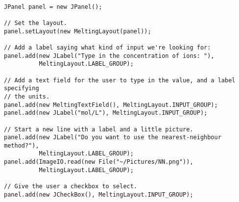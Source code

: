 \documentclass{article}
\begin{document}
\begin{verbatim}

JPanel panel = new JPanel();

// Set the layout.
panel.setLayout(new MeltingLayout(panel));

// Add a label saying what kind of input we're looking for:
panel.add(new JLabel("Type in the concentration of ions: "),
          MeltingLayout.LABEL_GROUP);

// Add a text field for the user to type in the value, and a label specifying
// the units.
panel.add(new MeltingTextField(), MeltingLayout.INPUT_GROUP);
panel.add(new JLabel("mol/L"), MeltingLayout.INPUT_GROUP);

// Start a new line with a label and a little picture.
panel.add(new JLabel("Do you want to use the nearest-neighbour method?"),
          MeltingLayout.LABEL_GROUP);
panel.add(ImageIO.read(new File("~/Pictures/NN.png")), 
          MeltingLayout.LABEL_GROUP);

// Give the user a checkbox to select.
panel.add(new JCheckBox(), MeltingLayout.INPUT_GROUP);

\end{verbatim}
\end{document}
